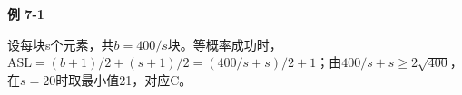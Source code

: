 {\color{ink}\bfseries 例 7-1}\par\vspace{1bp}设每块s个元素，共\(b=\allowbreak{}400/\allowbreak{}s\)块。等概率成功时，\(\mathrm{ASL}=\allowbreak{}(b+\allowbreak{}1)/\allowbreak{}2+\allowbreak{}(s+\allowbreak{}1)/\allowbreak{}2=\allowbreak{}(400/\allowbreak{}s+\allowbreak{}s)/\allowbreak{}2+\allowbreak{}1\)；由\(400/\allowbreak{}s+\allowbreak{}s\ge 2\sqrt{400}\)，在\(s=\allowbreak{}20\)时取最小值21，对应C。
